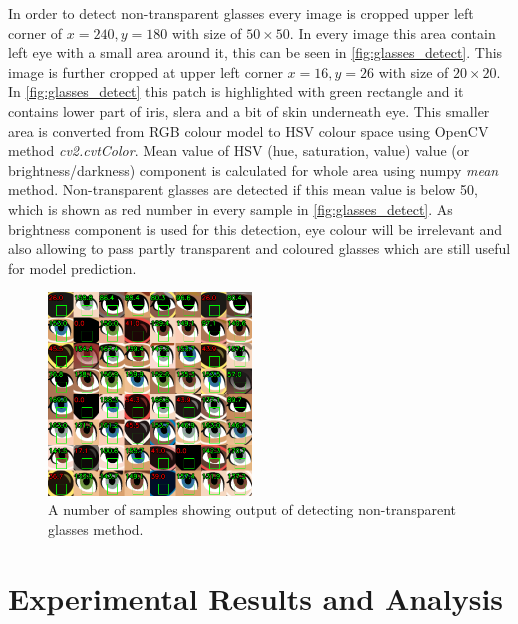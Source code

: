 \documentclass{article}
\begin{document}
In order to detect non-transparent glasses every image is cropped upper left corner of $x=240, y=180$ with size of $50\times 50$. In every image this area contain left eye with a small area around it, this can be seen in \autoref{fig:glasses_detect}. This image is further cropped at upper left corner $x=16, y=26$ with size of $20\times 20$. In \autoref{fig:glasses_detect} this patch is highlighted with green rectangle and it contains lower part of iris, slera and a bit of skin underneath eye. This smaller area is converted from RGB colour model to HSV colour space using OpenCV method \textit{cv2.cvtColor}. Mean value of HSV (hue, saturation, value) value (or brightness/darkness) component is calculated for whole area using numpy \textit{mean} method. Non-transparent glasses are detected if this mean value is below 50, which is shown as red number in every sample in \autoref{fig:glasses_detect}. As brightness component is used for this detection, eye colour will be irrelevant and also allowing to pass partly transparent and coloured glasses which are still useful for model prediction.
\begin{figure}[htb]
	\centering
	\includegraphics[width=0.48\textwidth]{graphics/B2_glasses_detect3.png}
	\caption{A number of samples showing output of detecting non-transparent glasses method.}
	\label{fig:glasses_detect}
\end{figure}



\section{Experimental Results and Analysis}
\label{sec:results}

\end{document}
